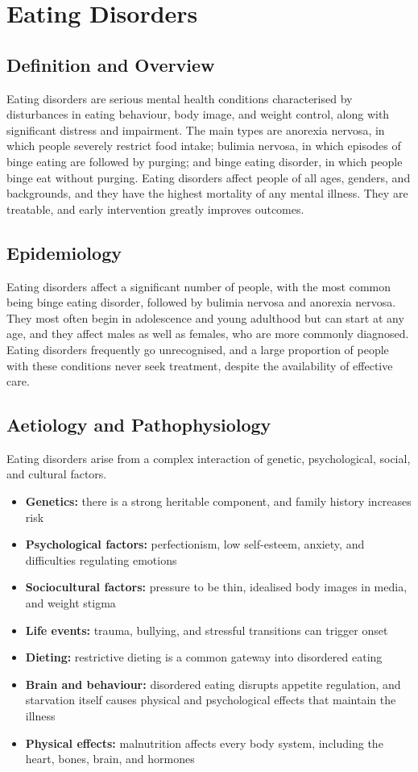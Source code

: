 \chapter{Eating Disorders}

\section*{Definition and Overview}
Eating disorders are serious mental health conditions characterised by disturbances in eating behaviour, body image, and weight control, along with significant distress and impairment. The main types are anorexia nervosa, in which people severely restrict food intake; bulimia nervosa, in which episodes of binge eating are followed by purging; and binge eating disorder, in which people binge eat without purging. Eating disorders affect people of all ages, genders, and backgrounds, and they have the highest mortality of any mental illness. They are treatable, and early intervention greatly improves outcomes.

\section*{Epidemiology}
Eating disorders affect a significant number of people, with the most common being binge eating disorder, followed by bulimia nervosa and anorexia nervosa. They most often begin in adolescence and young adulthood but can start at any age, and they affect males as well as females, who are more commonly diagnosed. Eating disorders frequently go unrecognised, and a large proportion of people with these conditions never seek treatment, despite the availability of effective care.

\section*{Aetiology and Pathophysiology}
Eating disorders arise from a complex interaction of genetic, psychological, social, and cultural factors.
\begin{itemize}
    \item \textbf{Genetics:} there is a strong heritable component, and family history increases risk
    \item \textbf{Psychological factors:} perfectionism, low self-esteem, anxiety, and difficulties regulating emotions
    \item \textbf{Sociocultural factors:} pressure to be thin, idealised body images in media, and weight stigma
    \item \textbf{Life events:} trauma, bullying, and stressful transitions can trigger onset
    \item \textbf{Dieting:} restrictive dieting is a common gateway into disordered eating
    \item \textbf{Brain and behaviour:} disordered eating disrupts appetite regulation, and starvation itself causes physical and psychological effects that maintain the illness
    \item \textbf{Physical effects:} malnutrition affects every body system, including the heart, bones, brain, and hormones
\end{itemize}

